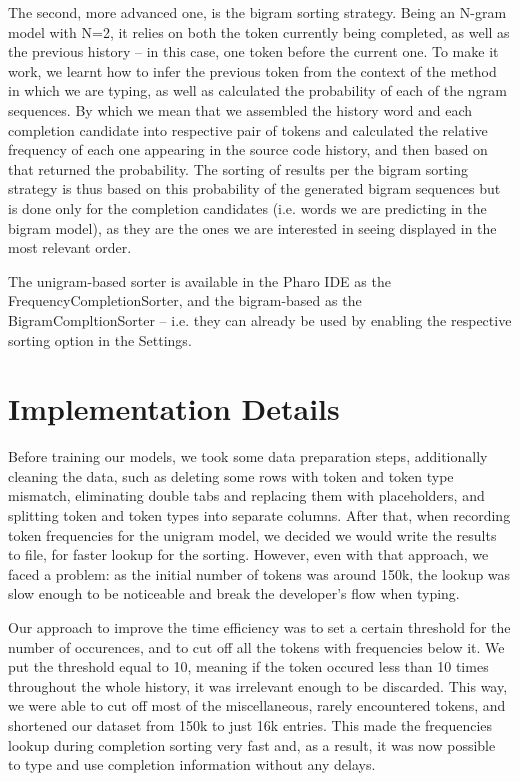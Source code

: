 The second, more advanced one, is the bigram sorting strategy. Being an N-gram model with N=2, it relies on both the token currently being completed, as well as the previous history -- in this case, one token before the current one. To make it work, we learnt how to infer the previous token from the context of the method in which we are typing, as well as calculated the probability of each of the ngram sequences. By which we mean that we assembled the history word and each completion candidate into respective pair of tokens and calculated the relative frequency of each one appearing in the source code history, and then based on that returned the probability. The sorting of results per the bigram sorting strategy is thus based on this probability of the generated bigram sequences but is done only for the completion candidates (i.e. words we are predicting in the bigram model), as they are the ones we are interested in seeing displayed in the most relevant order.

The unigram-based sorter is available in the Pharo IDE as the FrequencyCompletionSorter, and the bigram-based as the BigramCompltionSorter -- i.e. they can already be used by enabling the respective sorting option in the Settings. 

\section{Implementation Details}
\label{sec:ProposedSolution-Implementation}
Before training our models, we took some data preparation steps, additionally cleaning the data, such as deleting some rows with token and token type mismatch, eliminating double tabs and replacing them with placeholders, and splitting token and token types into separate columns. After that, when recording token frequencies for the unigram model, we decided we would write the results to file, for faster lookup for the sorting. However, even with that approach, we faced a problem: as the initial number of tokens was around 150k, the lookup was slow enough to be noticeable and break the developer's flow when typing. 

Our approach to improve the time efficiency was to set a certain threshold for the number of occurences, and to cut off all the tokens with frequencies below it. We put the threshold equal to 10, meaning if the token occured less than 10 times throughout the whole history, it was irrelevant enough to be discarded. This way, we were able to cut off most of the miscellaneous, rarely encountered tokens, and shortened our dataset from 150k to just 16k entries. This made the frequencies lookup during completion sorting very fast and, as a result, it was now possible to type and use completion information without any delays.

